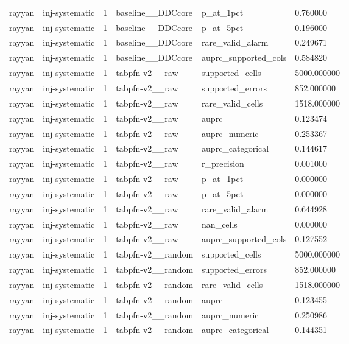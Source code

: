 \begin{tabular}{llllll}
rayyan & inj-systematic & 1 & baseline\_\_DDCcore & p\_at\_1pct & 0.760000 \\
rayyan & inj-systematic & 1 & baseline\_\_DDCcore & p\_at\_5pct & 0.196000 \\
rayyan & inj-systematic & 1 & baseline\_\_DDCcore & rare\_valid\_alarm & 0.249671 \\
rayyan & inj-systematic & 1 & baseline\_\_DDCcore & auprc\_supported\_cols & 0.584820 \\
rayyan & inj-systematic & 1 & tabpfn-v2\_\_raw & supported\_cells & 5000.000000 \\
rayyan & inj-systematic & 1 & tabpfn-v2\_\_raw & supported\_errors & 852.000000 \\
rayyan & inj-systematic & 1 & tabpfn-v2\_\_raw & rare\_valid\_cells & 1518.000000 \\
rayyan & inj-systematic & 1 & tabpfn-v2\_\_raw & auprc & 0.123474 \\
rayyan & inj-systematic & 1 & tabpfn-v2\_\_raw & auprc\_numeric & 0.253367 \\
rayyan & inj-systematic & 1 & tabpfn-v2\_\_raw & auprc\_categorical & 0.144617 \\
rayyan & inj-systematic & 1 & tabpfn-v2\_\_raw & r\_precision & 0.001000 \\
rayyan & inj-systematic & 1 & tabpfn-v2\_\_raw & p\_at\_1pct & 0.000000 \\
rayyan & inj-systematic & 1 & tabpfn-v2\_\_raw & p\_at\_5pct & 0.000000 \\
rayyan & inj-systematic & 1 & tabpfn-v2\_\_raw & rare\_valid\_alarm & 0.644928 \\
rayyan & inj-systematic & 1 & tabpfn-v2\_\_raw & nan\_cells & 0.000000 \\
rayyan & inj-systematic & 1 & tabpfn-v2\_\_raw & auprc\_supported\_cols & 0.127552 \\
rayyan & inj-systematic & 1 & tabpfn-v2\_\_random & supported\_cells & 5000.000000 \\
rayyan & inj-systematic & 1 & tabpfn-v2\_\_random & supported\_errors & 852.000000 \\
rayyan & inj-systematic & 1 & tabpfn-v2\_\_random & rare\_valid\_cells & 1518.000000 \\
rayyan & inj-systematic & 1 & tabpfn-v2\_\_random & auprc & 0.123455 \\
rayyan & inj-systematic & 1 & tabpfn-v2\_\_random & auprc\_numeric & 0.250986 \\
rayyan & inj-systematic & 1 & tabpfn-v2\_\_random & auprc\_categorical & 0.144351 \\

\end{tabular}
